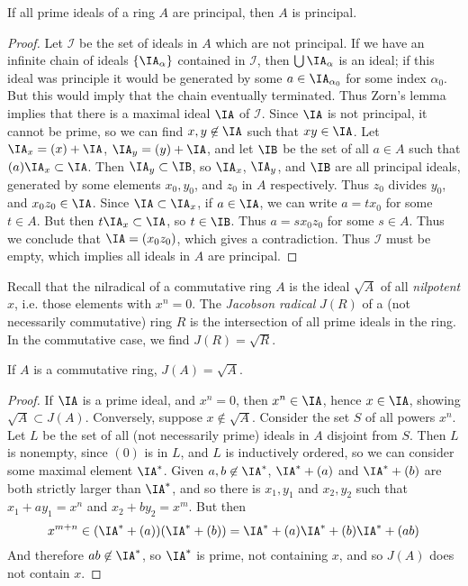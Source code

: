 \begin{theorem}
    If all prime ideals of a ring $A$ are principal, then $A$ is principal.
\end{theorem}
\begin{proof}
    Let $\mathcal{I}$ be the set of ideals in $A$ which are not principal. If we have an infinite chain of ideals $\{ \IA_\alpha \}$ contained in $\mathcal{I}$, then $\bigcup \IA_\alpha$ is an ideal; if this ideal was principle it would be generated by some $a \in \IA_{\alpha_0}$ for some index $\alpha_0$. But this would imply that the chain eventually terminated. Thus Zorn's lemma implies that there is a maximal ideal $\IA$ of $\mathcal{I}$. Since $\IA$ is not principal, it cannot be prime, so we can find $x,y \not \in \IA$ such that $xy \in \IA$. Let $\IA_x = (x) + \IA$, $\IA_y = (y) + \IA$, and let $\IB$ be the set of all $a \in A$ such that $(a) \IA_x \subset \IA$. Then $\IA_y \subset \IB$, so $\IA_x$, $\IA_y$, and $\IB$ are all principal ideals, generated by some elements $x_0,y_0$, and $z_0$ in $A$ respectively. Thus $z_0$ divides $y_0$, and $x_0z_0 \in \IA$. Since $\IA \subset \IA_x$, if $a \in \IA$, we can write $a = tx_0$ for some $t \in A$. But then $t\IA_x \subset \IA$, so $t \in \IB$. Thus $a = sx_0z_0$ for some $s \in A$. Thus we conclude that $\IA = (x_0z_0)$, which gives a contradiction. Thus $\mathcal{I}$ must be empty, which implies all ideals in $A$ are principal.
\end{proof}

Recall that the nilradical of a commutative ring $A$ is the ideal $\sqrt{A}$ of all {\it nilpotent} $x$, i.e. those elements with $x^n = 0$. The \emph{Jacobson radical} $J(R)$ of a (not necessarily commutative) ring $R$ is the intersection of all prime ideals in the ring. In the commutative case, we find $J(R) = \sqrt{R}$.

\begin{theorem}
    If $A$ is a commutative ring, $J(A) = \sqrt{A}$.
\end{theorem}
\begin{proof}
    If $\IA$ is a prime ideal, and $x^n = 0$, then $x^n \in \IA$, hence $x \in \IA$, showing $\sqrt{A} \subset J(A)$. Conversely, suppose $x \not \in \sqrt{A}$. Consider the set $S$ of all powers $x^n$. Let $L$ be the set of all (not necessarily prime) ideals in $A$ disjoint from $S$. Then $L$ is nonempty, since $(0)$ is in $L$, and $L$ is inductively ordered, so we can consider some maximal element $\IA^*$. Given $a,b \not \in \IA^*$, $\IA^* + (a)$ and $\IA^* + (b)$ are both strictly larger than $\IA^*$, and so there is $x_1,y_1$ and $x_2,y_2$ such that $x_1 + ay_1 = x^n$ and $x_2 + by_2 = x^m$. But then
    \[ x^{m+n} \in (\IA^* + (a))(\IA^* + (b)) = \IA^* + (a) \IA^* + (b) \IA^* + (ab) \]
    And therefore $ab \not \in \IA^*$, so $\IA^*$ is prime, not containing $x$, and so $J(A)$ does not contain $x$.
\end{proof}

